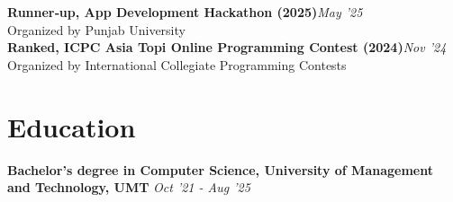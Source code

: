 \documentclass[10pt, letterpaper]{article}
\newcommand{\awardrow}[3]{%
  \noindent\textbf{#1}\hfill{\small\color{lightgray}\textit{#3}}\\
  {\small\color{lightgray}#2}\\[4pt]}
\begin{document}
\awardrow{Runner‑up, App Development Hackathon (2025)}{Organized by Punjab University}{May '25}
\awardrow{Ranked, ICPC Asia Topi Online Programming Contest (2024)}{Organized by International Collegiate Programming Contests}{Nov '24}

\section{Education}

\noindent\textbf{Bachelor's degree in Computer Science, University of Management and Technology, UMT}
\hfill{\small\color{lightgray}\textit{Oct '21 - Aug '25}}
\end{document}
